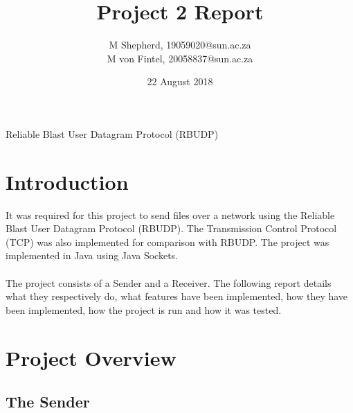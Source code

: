 \documentclass[13pt]{article}
\begin{document}
\title{Project 2 Report}
\author{M Shepherd, 19059020@sun.ac.za \\ M von Fintel, 20058837@sun.ac.za}
\date{22 August 2018}

\maketitle

\centerline{Reliable Blast User Datagram Protocol (RBUDP)}

\newpage

\section{Introduction}

It was required for this project to send files over a network using the Reliable
Blast User Datagram Protocol (RBUDP). The Transmission Control Protocol (TCP) was
also implemented for comparison with RBUDP. The project was implemented in Java
using Java Sockets.
\\\\
The project consists of a Sender and a Receiver. The following report details
what they respectively do, what features have been implemented, how they have been
implemented, how the project is run and how it was tested.

\section{Project Overview}

\subsection{The Sender}
\end{document}
